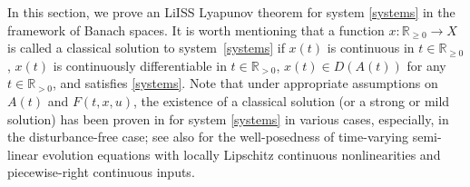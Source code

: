 \documentclass[onecolumn]{autart}
\newtheorem{definition}{Definition}
\newenvironment{proof of Prop.ODE}{{\it Proof of Proposition~\ref{Prop.ODE}:\enspace}}{\hfill $\blacksquare$\par}
\newenvironment{proof of PDE}{{\it Proof of Proposition \ref{Prop.8}:\enspace}}{\hfill $\blacksquare$\par}
\begin{document}
{%




	
	In this section, we prove an LiISS Lyapunov theorem for system \eqref{systems} in the framework of Banach spaces.
	It is worth mentioning that  a
	function $x:\mathbb{R}_{\geq0}\to X$ is called a  classical solution {to} system~\eqref{systems} if $x(t) $ is continuous in $t\in \mathbb{R}_{\geq0}$,  $x(t)$ is continuously differentiable in $t\in \mathbb{R}_{>0}$, $x(t)\in D(A(t))$ for any $t\in \mathbb{R}_{>0}$, and satisfies \eqref{systems}.
	Note that under appropriate assumptions on $A(t)$ and $F(t,x,u)$, the existence of a   classical solution (or a strong or mild solution)  has been proven in \cite{Pazy2012semigroups} for system \eqref{systems} in various cases, especially, in the disturbance-free case; {see also \cite{Heni:2025} for the well-posedness of  time-varying semi-linear evolution equations with locally Lipschitz continuous nonlinearities and piecewise-right continuous inputs}.
}
\end{document}
